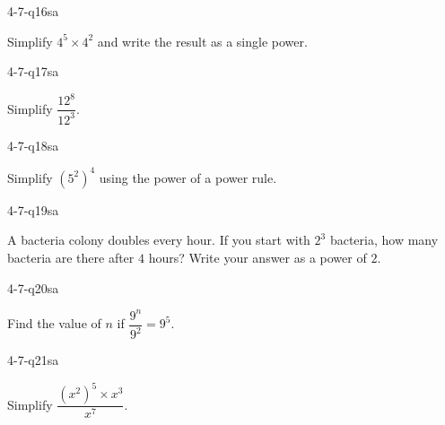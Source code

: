 \begin{practiceQuestion}{4-7-q16}{sa}
\begin{questionText}
Simplify $4^5 \times 4^2$ and write the result as a single power.
\end{questionText}
\end{practiceQuestion}

\begin{practiceQuestion}{4-7-q17}{sa}
\begin{questionText}
Simplify $\dfrac{12^8}{12^3}$.
\end{questionText}
\end{practiceQuestion}

\begin{practiceQuestion}{4-7-q18}{sa}
\begin{questionText}
Simplify $(5^2)^4$ using the power of a power rule.
\end{questionText}
\end{practiceQuestion}

\begin{practiceQuestion}{4-7-q19}{sa}
\begin{questionText}
A bacteria colony doubles every hour. If you start with $2^3$ bacteria, how many bacteria are there after $4$ hours? Write your answer as a power of $2$.
\end{questionText}
\end{practiceQuestion}

\begin{practiceQuestion}{4-7-q20}{sa}
\begin{questionText}
Find the value of $n$ if $\dfrac{9^n}{9^2} = 9^5$.
\end{questionText}
\end{practiceQuestion}

\begin{practiceQuestion}{4-7-q21}{sa}
\begin{questionText}
Simplify $\dfrac{(x^2)^5 \times x^3}{x^7}$.
\end{questionText}
\end{practiceQuestion}

